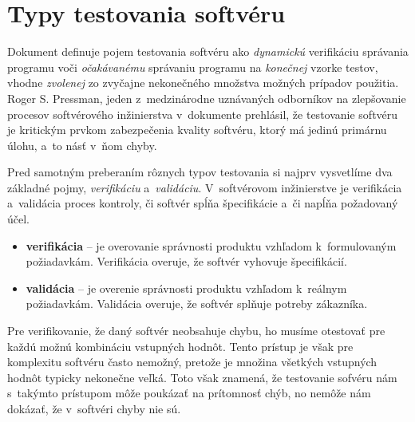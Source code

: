 \section{Typy testovania softvéru} 
\label{sekcia:typy_testovania}
Dokument \cite{Swebok} definuje pojem testovania softvéru ako 
\emph{dynamickú} verifikáciu správania programu voči \emph{očakávanému} 
správaniu programu na \emph{konečnej} vzorke testov, vhodne \emph{zvolenej} 
zo zvyčajne nekonečného množstva možných prípadov použitia.
Roger S. Pressman, jeden z~medzinárodne uznávaných odborníkov na 
zlepšovanie procesov softvérového inžinierstva v~dokumente 
\cite{Pressman} prehlásil, že testovanie softvéru je kritickým prvkom 
zabezpečenia kvality softvéru, ktorý má jedinú primárnu úlohu, 
a~to násť v~ňom chyby.  

Pred samotným preberaním rôznych typov testovania si najprv vysvetlíme
dva základné pojmy, \emph{verifikáciu} a~\emph{validáciu}. 
V~softvérovom inžinierstve je verifikácia a~validácia proces kontroly, či
softvér spĺňa špecifikácie a~či napĺňa požadovaný účel.
\begin{itemize}
\item \textbf{verifikácia} -- je overovanie správnosti produktu vzhľadom
k~formulovaným požiadavkám. Verifikácia overuje, že softvér vyhovuje 
špecifikácií.
\item \textbf{validácia} -- je overenie správnosti produktu vzhľadom
k~reálnym požiadavkám. Validácia overuje, že softvér splňuje potreby
zákazníka.
\end{itemize}

Pre verifikovanie, že daný softvér neobsahuje chybu, ho musíme otestovať
pre každú možnú kombináciu vstupných hodnôt. Tento prístup je však pre 
komplexitu softvéru často nemožný, pretože je množina všetkých vstupných
hodnôt typicky nekonečne veľká. 
Toto však znamená, že testovanie sofvéru nám s~takýmto 
prístupom môže poukázať na prítomnosť chýb, no nemôže nám dokázať, 
že v~softvéri chyby nie sú.


